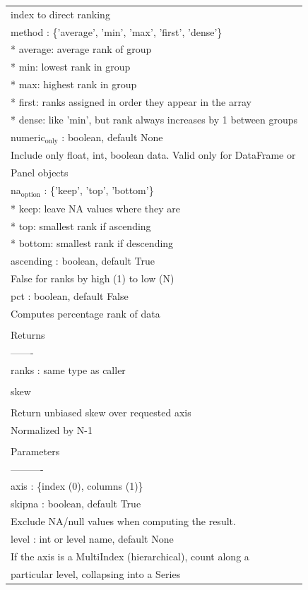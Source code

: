 \documentclass[11pt]{article}
\begin{document}
\begin{enumerate}
\begin{enumerate}
\begin{enumerate}
\begin{center}
\begin{tabular}{l}
index to direct ranking\\
method : \{'average', 'min', 'max', 'first', 'dense'\}\\
* average: average rank of group\\
* min: lowest rank in group\\
* max: highest rank in group\\
* first: ranks assigned in order they appear in the array\\
* dense: like 'min', but rank always increases by 1 between groups\\
numeric\(_{\text{only}}\) : boolean, default None\\
Include only float, int, boolean data. Valid only for DataFrame or\\
Panel objects\\
na\(_{\text{option}}\) : \{'keep', 'top', 'bottom'\}\\
* keep: leave NA values where they are\\
* top: smallest rank if ascending\\
* bottom: smallest rank if descending\\
ascending : boolean, default True\\
False for ranks by high (1) to low (N)\\
pct : boolean, default False\\
Computes percentage rank of data\\
\\
Returns\\
-------\\
ranks : same type as caller\\
\\
skew\\
\\
Return unbiased skew over requested axis\\
Normalized by N-1\\
\\
Parameters\\
----------\\
axis : \{index (0), columns (1)\}\\
skipna : boolean, default True\\
Exclude NA/null values when computing the result.\\
level : int or level name, default None\\
If the axis is a MultiIndex (hierarchical), count along a\\
particular level, collapsing into a Series\\

\end{tabular}
\end{center}
\end{enumerate}
\end{enumerate}
\end{enumerate}
\end{document}
